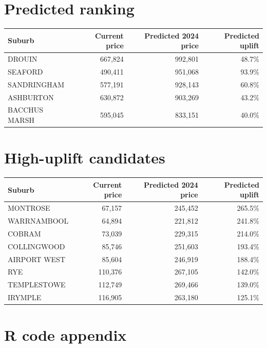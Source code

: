 \documentclass[11pt]{article}
\begin{document}
\section*{Predicted ranking}

\begin{tabular}{lrrr}
\toprule
Suburb & Current price & Predicted 2024 price & Predicted uplift \\
\midrule
DROUIN & 667,824 & 992,801 & 48.7\% \\
SEAFORD & 490,411 & 951,068 & 93.9\% \\
SANDRINGHAM & 577,191 & 928,143 & 60.8\% \\
ASHBURTON & 630,872 & 903,269 & 43.2\% \\
BACCHUS MARSH & 595,045 & 833,151 & 40.0\% \\
\bottomrule
\end{tabular}

\section*{High-uplift candidates}

\begin{tabular}{lrrr}
\toprule
Suburb & Current price & Predicted 2024 price & Predicted uplift \\
\midrule
MONTROSE & 67,157 & 245,452 & 265.5\% \\
WARRNAMBOOL & 64,894 & 221,812 & 241.8\% \\
COBRAM & 73,039 & 229,315 & 214.0\% \\
COLLINGWOOD & 85,746 & 251,603 & 193.4\% \\
AIRPORT WEST & 85,604 & 246,919 & 188.4\% \\
RYE & 110,376 & 267,105 & 142.0\% \\
TEMPLESTOWE & 112,749 & 269,466 & 139.0\% \\
IRYMPLE & 116,905 & 263,180 & 125.1\% \\
\bottomrule
\end{tabular}

\section*{R code appendix}
\end{document}
